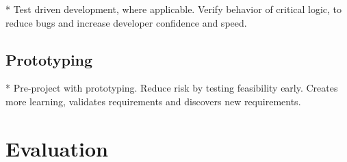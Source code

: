 * Test driven development, where applicable. Verify behavior of critical logic, to reduce bugs and increase developer confidence and speed.


\subsection{Prototyping}

* Pre-project with prototyping. Reduce risk by testing feasibility early. Creates more learning, validates requirements and discovers new requirements.


\section{Evaluation}


